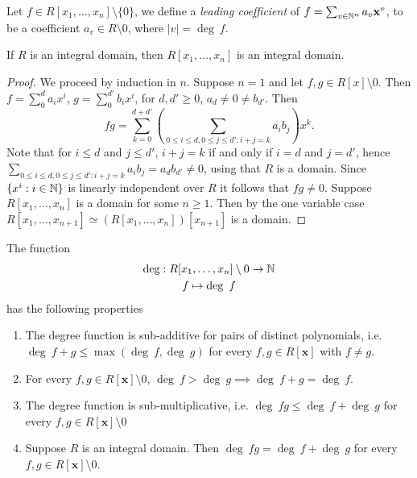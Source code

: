     \begin{definition}
        Let $f\in R[x_1,\dots,x_n]\setminus\{0\}$, we define a \textit{leading coefficient} of $f=\sum_{v\in \mathbb{N}^n} a_v\mathbf{x}^v$, to be a coefficient $a_v\in R\setminus 0$, where $\vert v\vert = \deg \ f$. 
    \end{definition}
    \begin{lemma}\label{PolynomialRingOverDomainIsDomain}
        If $R$ is an integral domain, then $R[x_1,\dots,x_n]$ is an integral domain.
    \end{lemma}
    \begin{proof}
        We proceed by induction in $n$. Suppose $n=1$ and let $f,g\in R[x]\setminus 0$. Then $f=\sum_0^d a_ix^i$, $g=\sum_0^{d'}b_ix^i$, for $d,d'\geq 0$, $a_d\neq0\neq b_{d'}$. Then 
        $$
            fg = \sum_{k=0}^{d+d'} \left(\sum_{0\leq i\leq d, 0\leq j\leq d' : i+j=k} a_ib_j\right) x^k.
        $$
        Note that for $i\leq d$ and $j\leq d'$, $i+j = k$ if and only if $i=d$ and $j=d'$, hence
        $\sum_{0\leq i\leq d, 0\leq j\leq d' : i+j=k} a_ib_j = a_db_{d'} \neq 0$, using that $R$ is a domain. Since $\{x^i : i\in\mathbb{N}\}$ is linearly independent over $R$ it follows that $fg \neq 0$.
        Suppose $R[x_1,\dots, x_n]$ is a domain for some $n\geq 1$. Then by the one variable case $R[x_1,\dots,x_{n+1}]\simeq (R[x_1,\dots,x_n])[x_{n+1}]$ is a domain. 
\end{proof}
\begin{corollary}\label{PropertiesOfDegreeFunction}
     The function 
    \begin{gather*}
        \deg : R[x_1,\dots,x_n]\setminus 0 \rightarrow \mathbb{N}\\
        f\mapsto \deg \ f
    \end{gather*}
    has the following properties 
    \begin{enumerate}
        \item The degree function is sub-additive for pairs of distinct polynomials, i.e. $\deg \ f + g \leq \max(\deg\ f, \deg \ g)$ for every $f,g\in R[\mathbf{x}]$ with $f\neq g$.
        \item For every $f,g\in R[\mathbf{x}]\setminus 0$, $\deg \ f >\deg \ g\implies \deg \ f+g = \deg \ f$.
        \item The degree function is sub-multiplicative, i.e. $\deg \ fg \leq \deg \ f+ \deg \ g$ for every $f,g\in R[\mathbf{x}]\setminus 0$
        \item Suppose $R$ is an integral domain. Then $\deg \ fg = \deg \ f+ \deg \ g$ for every $f,g\in R[\mathbf{x}]\setminus 0$.
    \end{enumerate}
\end{corollary}
